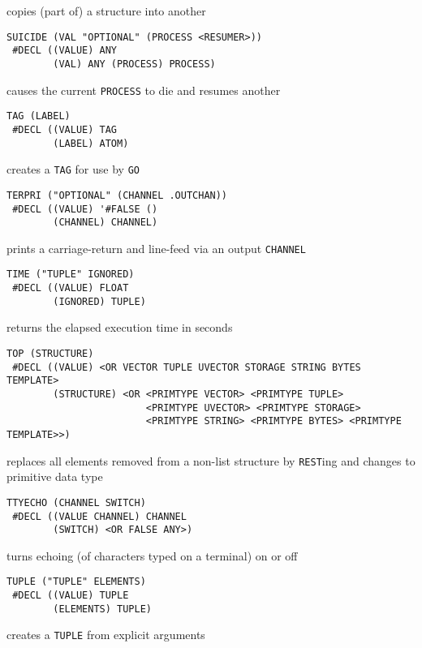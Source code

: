 \documentclass[a4paper]{scrbook}
\begin{document}
copies (part of) a structure into another

\begin{verbatim}
SUICIDE (VAL "OPTIONAL" (PROCESS <RESUMER>))
 #DECL ((VALUE) ANY
        (VAL) ANY (PROCESS) PROCESS)
\end{verbatim}

causes the current \texttt{PROCESS} to die and resumes another

\begin{verbatim}
TAG (LABEL)
 #DECL ((VALUE) TAG
        (LABEL) ATOM)
\end{verbatim}

creates a \texttt{TAG} for use by \texttt{GO}

\begin{verbatim}
TERPRI ("OPTIONAL" (CHANNEL .OUTCHAN))
 #DECL ((VALUE) '#FALSE ()
        (CHANNEL) CHANNEL)
\end{verbatim}

prints a carriage-return and line-feed via an output \texttt{CHANNEL}

\begin{verbatim}
TIME ("TUPLE" IGNORED)
 #DECL ((VALUE) FLOAT
        (IGNORED) TUPLE)
\end{verbatim}

returns the elapsed execution time in seconds

\begin{verbatim}
TOP (STRUCTURE)
 #DECL ((VALUE) <OR VECTOR TUPLE UVECTOR STORAGE STRING BYTES TEMPLATE>
        (STRUCTURE) <OR <PRIMTYPE VECTOR> <PRIMTYPE TUPLE>
                        <PRIMTYPE UVECTOR> <PRIMTYPE STORAGE>
                        <PRIMTYPE STRING> <PRIMTYPE BYTES> <PRIMTYPE TEMPLATE>>)
\end{verbatim}

replaces all elements removed from a non-list structure by \texttt{REST}ing and changes to primitive data type

\begin{verbatim}
TTYECHO (CHANNEL SWITCH)
 #DECL ((VALUE CHANNEL) CHANNEL
        (SWITCH) <OR FALSE ANY>)
\end{verbatim}

turns echoing (of characters typed on a terminal) on or off

\begin{verbatim}
TUPLE ("TUPLE" ELEMENTS)
 #DECL ((VALUE) TUPLE
        (ELEMENTS) TUPLE)
\end{verbatim}

creates a \texttt{TUPLE} from explicit arguments
\end{document}
